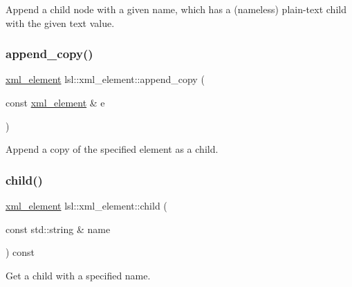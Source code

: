 Append a child node with a given name, which has a (nameless) plain-\/text child with the given text value. \mbox{\label{classlsl_1_1xml__element_a73fc3bfe22e1117907a2d80ba33d2208}} 
\subsubsection{\texorpdfstring{append\+\_\+copy()}{append\_copy()}}
{\footnotesize\ttfamily \hyperlink{classlsl_1_1xml__element}{xml\+\_\+element} lsl\+::xml\+\_\+element\+::append\+\_\+copy (\begin{DoxyParamCaption}\item[{const \hyperlink{classlsl_1_1xml__element}{xml\+\_\+element} \&}]{e }\end{DoxyParamCaption})\hspace{0.3cm}{\ttfamily [inline]}}



Append a copy of the specified element as a child. 

\mbox{\label{classlsl_1_1xml__element_a111ef129dce406af43948d8c9b915148}} 
\subsubsection{\texorpdfstring{child()}{child()}}
{\footnotesize\ttfamily \hyperlink{classlsl_1_1xml__element}{xml\+\_\+element} lsl\+::xml\+\_\+element\+::child (\begin{DoxyParamCaption}\item[{const std\+::string \&}]{name }\end{DoxyParamCaption}) const\hspace{0.3cm}{\ttfamily [inline]}}



Get a child with a specified name. 

\mbox{\label{classlsl_1_1xml__element_ac99677d44f66ba850afd9b669e26452f}} 
